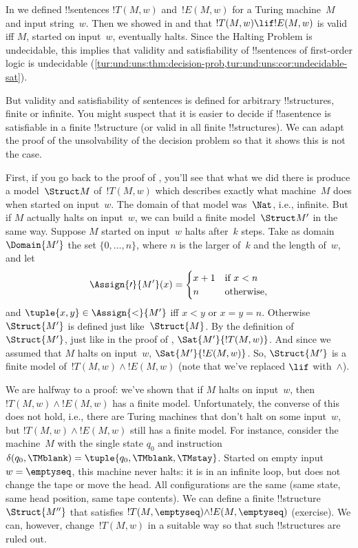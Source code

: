\documentclass[../../../include/open-logic-section]{subfiles}
\begin{document}

\begin{explain}
  In  we defined !!{sentence}s $!T(M,w)$ and~$!E(M,w)$
  for a Turing machine~$M$ and input string~$w$. Then we showed in
   and 
  that $!T(M,w) \lif !E(M,w)$ is valid iff $M$, started on input~$w$,
  eventually halts. Since the Halting Problem is undecidable, this
  implies that validity and satisfiability of !!{sentence}s of
  first-order logic is undecidable
  (\cref{tur:und:uns:thm:decision-prob,tur:und:uns:cor:undecidable-sat}).

  But validity and satisfiability of sentences is defined for
  arbitrary !!{structure}s, finite or infinite. You might suspect that
  it is easier to decide if !!a{sentence} is satisfiable in a finite
  !!{structure} (or valid in all finite !!{structure}s). We can adapt
  the proof of the unsolvability of the decision problem so that it
  shows this is not the case.

  First, if you go back to the proof of
  , you'll see that what we did there is
  produce a model~$\Struct M$ of~$!T(M,w)$ which describes exactly
  what machine~$M$ does when started on input~$w$.  The domain of that
  model was~$\Nat$, i.e., infinite. But if $M$ actually halts on
  input~$w$, we can build a finite model~$\Struct M'$ in the same way.
  Suppose $M$ started on input~$w$ halts after~$k$ steps. Take as
  domain~$\Domain{M'}$ the set $\{0, \dots, n\}$, where $n$ is the
  larger of~$k$ and the length of~$w$, and let
  \[
    \Assign{\prime}{M'}(x) = 
    \begin{cases}
      x + 1 &\text{if $x < n$}\\
      n &\text{otherwise,}
    \end{cases}
  \]
  and $\tuple{x,y} \in \Assign{<}{M'}$ iff $x < y$ or $x = y = n$.
  Otherwise $\Struct{M'}$ is defined just like~$\Struct{M}$. By the
  definition of~$\Struct{M'}$, just like in the proof of
  , $\Sat{M'}{!T(M,w)}$.  And since we
  assumed that $M$ halts on input~$w$, $\Sat{M'}{!E(M,w)}$. So,
  $\Struct{M'}$ is a finite model of~$!T(M,w) \land !E(M,w)$ (note
  that we've replaced $\lif$ with~$\land$).
  
  We are halfway to a proof: we've shown that if $M$ halts on
  input~$w$, then $!T(M,w) \land !E(M,w)$ has a finite model.
  Unfortunately, the converse of this does not hold, i.e., there are
  Turing machines that don't halt on some input~$w$, but $!T(M,w)
  \land !E(M,w)$ still has a finite model. For instance, consider the
  machine~$M$ with the single state $q_0$ and instruction
  $\delta(q_0,\TMblank) = \tuple{q_0,\TMblank,\TMstay}$. Started on
  empty input~$w = \emptyseq$, this machine never halts: it is in an
  infinite loop, but does not change the tape or move the head. All
  configurations are the same (same state, same head position, same
  tape contents). We can define a finite !!{structure}~$\Struct{M''}$
  that satisfies $!T(M,\emptyseq) \land !E(M,\emptyseq)$ (exercise).
  We can, however, change~$!T(M,w)$ in a suitable way so that such
  !!{structure}s are ruled out.


\end{explain}
\end{document}
